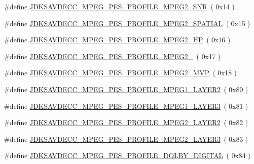 \begin{DoxyCompactItemize}
\#define \hyperlink{group__mpeg__pes__profile_ga93f2c33595c859fff7b6c0b15a2dc8a6}{J\+D\+K\+S\+A\+V\+D\+E\+C\+C\+\_\+\+M\+P\+E\+G\+\_\+\+P\+E\+S\+\_\+\+P\+R\+O\+F\+I\+L\+E\+\_\+\+M\+P\+E\+G2\+\_\+\+S\+NR}~( 0x14 )
\item 
\#define \hyperlink{group__mpeg__pes__profile_gab21e9ebc6c24990f1ee12e3e62cbde69}{J\+D\+K\+S\+A\+V\+D\+E\+C\+C\+\_\+\+M\+P\+E\+G\+\_\+\+P\+E\+S\+\_\+\+P\+R\+O\+F\+I\+L\+E\+\_\+\+M\+P\+E\+G2\+\_\+\+S\+P\+A\+T\+I\+AL}~( 0x15 )
\item 
\#define \hyperlink{group__mpeg__pes__profile_ga270d15ff431c40616c79bd2be7cab878}{J\+D\+K\+S\+A\+V\+D\+E\+C\+C\+\_\+\+M\+P\+E\+G\+\_\+\+P\+E\+S\+\_\+\+P\+R\+O\+F\+I\+L\+E\+\_\+\+M\+P\+E\+G2\+\_\+\+HP}~( 0x16 )
\item 
\#define \hyperlink{group__mpeg__pes__profile_ga983a021b66af0f44f7c4f06ecec20d17}{J\+D\+K\+S\+A\+V\+D\+E\+C\+C\+\_\+\+M\+P\+E\+G\+\_\+\+P\+E\+S\+\_\+\+P\+R\+O\+F\+I\+L\+E\+\_\+\+M\+P\+E\+G2\+\_}~( 0x17 )
\item 
\#define \hyperlink{group__mpeg__pes__profile_ga3643b002a19175512be8587b99f15d21}{J\+D\+K\+S\+A\+V\+D\+E\+C\+C\+\_\+\+M\+P\+E\+G\+\_\+\+P\+E\+S\+\_\+\+P\+R\+O\+F\+I\+L\+E\+\_\+\+M\+P\+E\+G2\+\_\+\+M\+VP}~( 0x18 )
\item 
\#define \hyperlink{group__mpeg__pes__profile_gaa303adfa921a8cdf9367db776d7080a7}{J\+D\+K\+S\+A\+V\+D\+E\+C\+C\+\_\+\+M\+P\+E\+G\+\_\+\+P\+E\+S\+\_\+\+P\+R\+O\+F\+I\+L\+E\+\_\+\+M\+P\+E\+G1\+\_\+\+L\+A\+Y\+E\+R2}~( 0x80 )
\item 
\#define \hyperlink{group__mpeg__pes__profile_ga4d153af0e38027b2f9ccc3cf0aa47755}{J\+D\+K\+S\+A\+V\+D\+E\+C\+C\+\_\+\+M\+P\+E\+G\+\_\+\+P\+E\+S\+\_\+\+P\+R\+O\+F\+I\+L\+E\+\_\+\+M\+P\+E\+G1\+\_\+\+L\+A\+Y\+E\+R3}~( 0x81 )
\item 
\#define \hyperlink{group__mpeg__pes__profile_gae0075442bff2fea40a0221e580f72444}{J\+D\+K\+S\+A\+V\+D\+E\+C\+C\+\_\+\+M\+P\+E\+G\+\_\+\+P\+E\+S\+\_\+\+P\+R\+O\+F\+I\+L\+E\+\_\+\+M\+P\+E\+G2\+\_\+\+L\+A\+Y\+E\+R2}~( 0x82 )
\item 
\#define \hyperlink{group__mpeg__pes__profile_ga535a43ed59c35214d394322c0480a043}{J\+D\+K\+S\+A\+V\+D\+E\+C\+C\+\_\+\+M\+P\+E\+G\+\_\+\+P\+E\+S\+\_\+\+P\+R\+O\+F\+I\+L\+E\+\_\+\+M\+P\+E\+G2\+\_\+\+L\+A\+Y\+E\+R3}~( 0x83 )
\item 
\#define \hyperlink{group__mpeg__pes__profile_ga0ea76f45d93523d4b8e392f11aed90b5}{J\+D\+K\+S\+A\+V\+D\+E\+C\+C\+\_\+\+M\+P\+E\+G\+\_\+\+P\+E\+S\+\_\+\+P\+R\+O\+F\+I\+L\+E\+\_\+\+D\+O\+L\+B\+Y\+\_\+\+D\+I\+G\+I\+T\+AL}~( 0x84 )

\end{DoxyCompactItemize}
